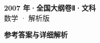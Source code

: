\documentclass[zihao=-4, a4paper]{ctexart}
\begin{document}
\begin{center}
  {\Large\bfseries 2007 年·全国大纲卷Ⅱ·文科}\\[4pt]
  {\large 数学 · 解析版}
\end{center}
\medskip
{}

\clearpage
{}
\begin{center}{\Large\bfseries 参考答案与详细解析}\end{center}
\medskip

\end{document}
